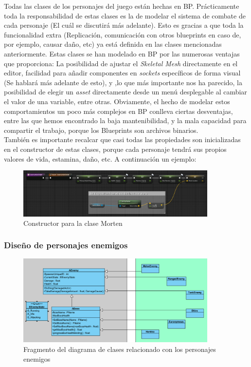 Todas las clases de los personajes del juego están hechas en \ac{BP}. Prácticamente toda la responsabilidad de estas clases es la de modelar el sistema de combate de cada personaje (El cuál se discutirá más adelante). Esto es gracias a que toda la funcionalidad extra (Replicación, comunicación con otros blueprints en caso de, por ejemplo, causar daño, etc) ya está definida en las clases mencionadas anteriormente. Estas clases se han modelado en \ac{BP} por las numerosas ventajas que proporciona: La posibilidad de ajustar el \textit{Skeletal Mesh} directamente en el editor, facilidad para añadir componentes en \textit{sockets} específicos de forma visual (Se hablará más adelante de esto), y ,lo que más importante nos ha parecido, la posibilidad de elegir un \textit{asset} directamente desde un menú desplegable al cambiar el valor de una variable, entre otras. Obviamente, el hecho de modelar estos comportamientos un poco más complejos en \ac{BP} conlleva ciertas desventajas, entre las que hemos encontrado la baja mantenibilidad, y la mala capacidad para compartir el trabajo, porque los Blueprints son archivos binarios.
\\

También es importante recalcar que casi todas las propiedades son inicializadas en el constructor de estas clases, porque cada personaje tendrá sus propios valores de vida, estamina, daño, etc. A continuación un ejemplo:

\begin{figure}[H]
  \centering
  \includegraphics[width=10cm]{./images/BP_Morten_Constructor.png}
  \caption{Constructor para la clase Morten}
  \label{MortenConstructor}
\end{figure}


\subsubsection{Diseño de personajes enemigos}

\begin{figure}[H]
  \centering
  \includegraphics[width=10cm]{./images/Classes_Enemigos.png}
  \caption{Fragmento del diagrama de clases relacionado con los personajes enemigos}
  \label{ClassesEnemies}
\end{figure}


